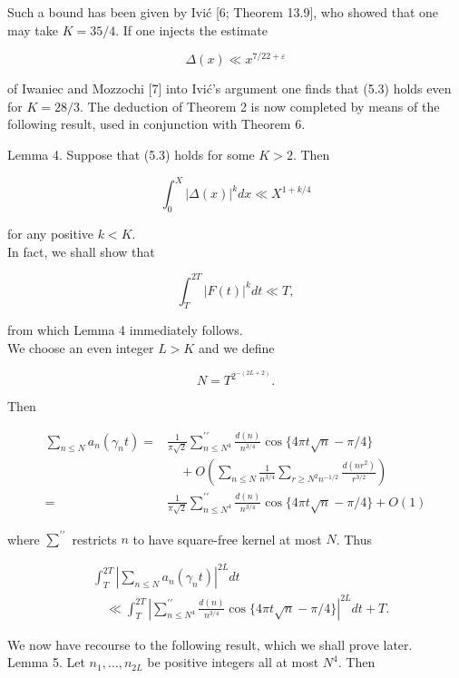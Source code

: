 \documentclass[10pt]{article}
\begin{document}
Such a bound has been given by Ivić [6; Theorem 13.9], who showed that one may take $K=35 / 4$. If one injects the estimate

$$
\Delta(x) \ll x^{7 / 22+\varepsilon}
$$

of Iwaniec and Mozzochi [7] into Ivić's argument one finds that (5.3) holds even for $K=28 / 3$. The deduction of Theorem 2 is now completed by means of the following result, used in conjunction with Theorem 6.

Lemma 4. Suppose that (5.3) holds for some $K>2$. Then

$$
\int_{0}^{X}|\Delta(x)|^{k} d x \ll X^{1+k / 4}
$$

for any positive $k<K$.\\
In fact, we shall show that

$$
\int_{T}^{2 T}|F(t)|^{k} d t \ll T,
$$

from which Lemma 4 immediately follows.\\
We choose an even integer $L>K$ and we define


\begin{equation*}
N=T^{2^{-(2 L+2)}}. \tag{5.4}
\end{equation*}


Then

$$
\begin{aligned}
\sum_{n \leq N} a_{n}\left(\gamma_{n} t\right)= & \frac{1}{\pi \sqrt{2}} \sum_{n \leq N^{4}}^{\prime \prime} \frac{d(n)}{n^{3 / 4}} \cos \{4 \pi t \sqrt{n}-\pi / 4\} \\
& \quad+O\left(\sum_{n \leq N} \frac{1}{n^{3 / 4}} \sum_{r \geq N^{2} n^{-1 / 2}} \frac{d\left(n r^{2}\right)}{r^{3 / 2}}\right) \\
= & \frac{1}{\pi \sqrt{2}} \sum_{n \leq N^{4}}^{\prime \prime} \frac{d(n)}{n^{3 / 4}} \cos \{4 \pi t \sqrt{n}-\pi / 4\}+O(1)
\end{aligned}
$$

where $\sum^{\prime \prime}$ restricts $n$ to have square-free kernel at most $N$. Thus


\begin{align*}
& \int_{T}^{2 T}\left|\sum_{n \leq N} a_{n}\left(\gamma_{n} t\right)\right|^{2 L} d t  \tag{5.5}\\
& \quad \ll \int_{T}^{2 T}\left|\sum_{n \leq N^{4}}^{\prime \prime} \frac{d(n)}{n^{3 / 4}} \cos \{4 \pi t \sqrt{n}-\pi / 4\}\right|^{2 L} d t+T.
\end{align*}


We now have recourse to the following result, which we shall prove later.\\
Lemma 5. Let $n_{1}, \ldots, n_{2 L}$ be positive integers all at most $N^{4}$. Then
\end{document}
